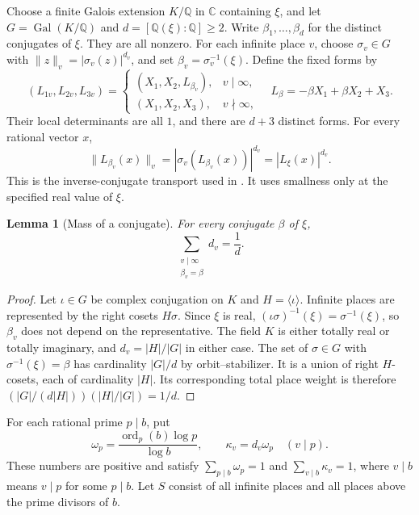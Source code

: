 \documentclass[11pt]{article}
\numberwithin{equation}{section}
\newtheorem{lemma}[theorem]{Lemma}
\theoremstyle{remark}\newtheorem{remark}[theorem]{Remark}
\newcommand{\Q}{\mathbb Q}\newcommand{\Z}{\mathbb Z}
\begin{document}
Choose a finite Galois extension $K/\Q$ in $\mathbb C$ containing
$\xi$, and let $G=\operatorname{Gal}(K/\Q)$ and
$d=[\Q(\xi):\Q]\ge2$. Write $\beta_1,\ldots,\beta_d$ for the distinct
conjugates of $\xi$. They are all nonzero.
For each infinite place $v$, choose $\sigma_v\in G$ with
$\|z\|_v=|\sigma_v(z)|^{d_v}$, and set $\beta_v=\sigma_v^{-1}(\xi)$.
Define the fixed forms by
\begin{equation}\label{eq:forms}
 (L_{1v},L_{2v},L_{3v})=
 \begin{cases}(X_1,X_2,L_{\beta_v}),&v\mid\infty,\\
 (X_1,X_2,X_3),&v\nmid\infty,
 \end{cases}
 \quad L_\beta=-\beta X_1+\beta X_2+X_3.
\end{equation}
Their local determinants are all $1$, and there are $d+3$ distinct forms.
For every rational vector $x$,
\begin{equation}\label{eq:transport}
 \|L_{\beta_v}(x)\|_v
 =|\sigma_v(L_{\beta_v}(x))|^{d_v}=|L_\xi(x)|^{d_v}.
\end{equation}
This is the inverse-conjugate transport used in
\cite[Section~5, equations (5.14)--(5.17)]{BE08}.
It uses smallness only at the specified real value of $\xi$.

\begin{lemma}[Mass of a conjugate]\label{lem:mass}
For every conjugate $\beta$ of $\xi$,
\begin{equation}\label{eq:mass}
 \sum_{\substack{v\mid\infty\\\beta_v=\beta}}d_v=\frac1d.
\end{equation}
\end{lemma}
\begin{proof}
Let $\iota\in G$ be complex conjugation on $K$ and
$H=\langle\iota\rangle$. Infinite places are represented by the right
cosets $H\sigma$. Since $\xi$ is real,
$(\iota\sigma)^{-1}(\xi)=\sigma^{-1}(\xi)$, so $\beta_v$ does not depend
on the representative. The field $K$ is either totally real or totally
imaginary, and $d_v=|H|/|G|$ in either case.
The set of $\sigma\in G$ with $\sigma^{-1}(\xi)=\beta$ has cardinality
$|G|/d$ by orbit--stabilizer. It is a union of right $H$-cosets, each of
cardinality $|H|$. Its corresponding total place weight is therefore
$(|G|/(d|H|))(|H|/|G|)=1/d$.
\end{proof}

For each rational prime $p\mid b$, put
\begin{equation}\label{eq:primeweights}
 \omega_p=\frac{\operatorname{ord}_p(b)\log p}{\log b},\qquad
 \kappa_v=d_v\omega_p\quad(v\mid p).
\end{equation}
These numbers are positive and satisfy
$\sum_{p\mid b}\omega_p=1$ and
$\sum_{v\mid b}\kappa_v=1$, where $v\mid b$ means $v\mid p$ for some
$p\mid b$. Let $S$ consist of all infinite places and all places above
the prime divisors of $b$.
\end{document}
